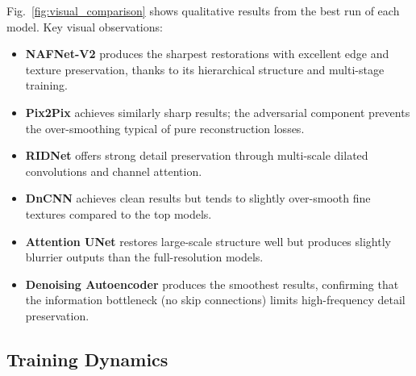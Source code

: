 Fig.~\ref{fig:visual_comparison} shows qualitative results from the best run of each model. Key visual observations:
\begin{itemize}
    \item \textbf{NAFNet-V2} produces the sharpest restorations with excellent edge and texture preservation, thanks to its hierarchical structure and multi-stage training.
    \item \textbf{Pix2Pix} achieves similarly sharp results; the adversarial component prevents the over-smoothing typical of pure reconstruction losses.
    \item \textbf{RIDNet} offers strong detail preservation through multi-scale dilated convolutions and channel attention.
    \item \textbf{DnCNN} achieves clean results but tends to slightly over-smooth fine textures compared to the top models.
    \item \textbf{Attention UNet} restores large-scale structure well but produces slightly blurrier outputs than the full-resolution models.
    \item \textbf{Denoising Autoencoder} produces the smoothest results, confirming that the information bottleneck (no skip connections) limits high-frequency detail preservation.
\end{itemize}

\subsection{Training Dynamics}


